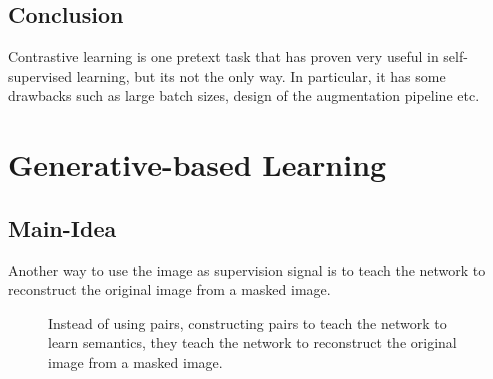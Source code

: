 \documentclass[11pt]{article}
\begin{document}
\begin{figure}[H]
    \centering
    \caption*{}
\end{figure}

\subsection{Conclusion}

Contrastive learning is one pretext task that has proven very useful in self-supervised learning, but its not the only way. In particular, it has some drawbacks such as large batch sizes, design of the augmentation pipeline etc.

\section{Generative-based Learning}\label{sect:generative-based-learning}

\subsection{Main-Idea}

Another way to use the image as supervision signal is to teach the network to reconstruct the original image from a masked image. 

\begin{figure}[H]
    \centering
    \caption*{Instead of using pairs, constructing pairs to teach the network to learn semantics, they teach the network to reconstruct the original image from a masked image.}
\end{figure}
\end{document}
